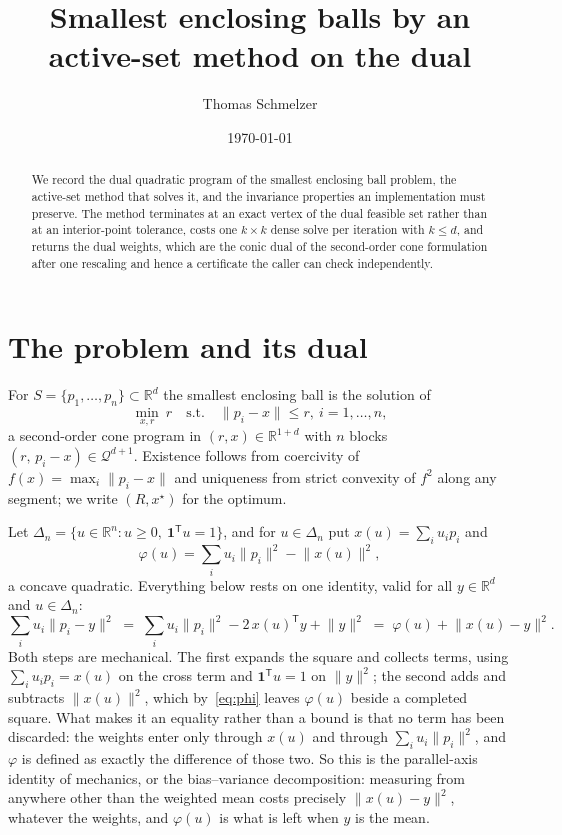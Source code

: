 \documentclass[10pt,a4paper]{article}
\title{\vspace{-1.2cm}\bfseries Smallest enclosing balls by an active-set method on the dual}
\author{Thomas Schmelzer}
\date{\today}
\theoremstyle{plain}
\theoremstyle{remark}
\newcommand{\R}{\mathbb{R}}
\newcommand{\norm}[1]{\lVert #1 \rVert}
\newcommand{\T}{^{\mathsf{T}}}
\begin{document}
\maketitle
\vspace{-0.6cm}

\begin{abstract}
\noindent
We record the dual quadratic program of the smallest enclosing ball problem, the
active-set method that solves it, and the invariance properties an
implementation must preserve. The method terminates at an exact vertex of the
dual feasible set rather than at an interior-point tolerance, costs one
$k\times k$ dense solve per iteration with $k\le d$, and returns the dual
weights, which are the conic dual of the second-order cone formulation after one
rescaling and hence a certificate the caller can check independently.
\end{abstract}

\section{The problem and its dual}

For $S=\{p_1,\dots,p_n\}\subset\R^d$ the smallest enclosing ball is the solution of
\begin{equation}
  \label{eq:primal}
  \min_{x,r}\ r \quad\text{s.t.}\quad \norm{p_i-x}\le r,\ i=1,\dots,n,
\end{equation}
a second-order cone program in $(r,x)\in\R^{1+d}$ with $n$ blocks
$(r,\,p_i-x)\in\mathcal{Q}^{d+1}$. Existence follows from coercivity of
$f(x)=\max_i\norm{p_i-x}$ and uniqueness from strict convexity of $f^2$ along any
segment; we write $(R,x^\star)$ for the optimum.

Let $\Delta_n=\{u\in\R^n: u\ge0,\ \mathbf{1}\T u=1\}$, and for $u\in\Delta_n$ put
$x(u)=\sum_i u_ip_i$ and
\begin{equation}
  \label{eq:phi}
  \varphi(u)=\sum_i u_i\norm{p_i}^2-\norm{x(u)}^2 ,
\end{equation}
a concave quadratic. Everything below rests on one identity, valid for all
$y\in\R^d$ and $u\in\Delta_n$:
\begin{equation}
  \label{eq:id}
  \sum_i u_i\norm{p_i-y}^2
    \;=\; \sum_i u_i\norm{p_i}^2-2\,x(u)\T y+\norm{y}^2
    \;=\; \varphi(u)+\norm{x(u)-y}^2 .
\end{equation}
Both steps are mechanical. The first expands the square and collects terms,
using $\sum_iu_ip_i=x(u)$ on the cross term and $\mathbf{1}\T u=1$ on
$\norm{y}^2$; the second adds and subtracts $\norm{x(u)}^2$, which
by~\eqref{eq:phi} leaves $\varphi(u)$ beside a completed square. What makes it
an equality rather than a bound is that no term has been discarded: the weights
enter only through $x(u)$ and through $\sum_iu_i\norm{p_i}^2$, and $\varphi$ is
defined as exactly the difference of those two. So this is the parallel-axis
identity of mechanics, or the bias--variance decomposition: measuring from
anywhere other than the weighted mean costs precisely $\norm{x(u)-y}^2$,
whatever the weights, and $\varphi(u)$ is what is left when $y$ is the mean.
\end{document}
